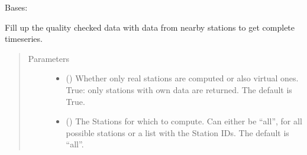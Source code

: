 \documentclass[letterpaper,10pt,english]{sphinxmanual}
\begin{document}

\begin{fulllineitems}
\label{\detokenize{weatherDB:weatherDB.stations.StationsTETBase}}
\sphinxAtStartPar
Bases: {\hyperref[\detokenize{weatherDB:weatherDB.stations.StationsBase}]{}}

\begin{fulllineitems}
\label{\detokenize{weatherDB:weatherDB.stations.StationsTETBase.fillup}}
\sphinxAtStartPar
Fill up the quality checked data with data from nearby stations to get complete timeseries.
\begin{quote}\begin{description}
\item[{Parameters}] \leavevmode\begin{itemize}
\item {} 
\sphinxAtStartPar
{} (\sphinxstyleliteralemphasis{\sphinxupquote{, }}) \textendash{} Whether only real stations are computed or also virtual ones.
True: only stations with own data are returned.
The default is True.

\item {} 
\sphinxAtStartPar
{} (\sphinxstyleliteralemphasis{\sphinxupquote{, }}) \textendash{} The Stations for which to compute.
Can either be “all”, for all possible stations
or a list with the Station IDs.
The default is “all”.

\end{itemize}


\end{description}
\end{quote}
\end{fulllineitems}
\end{fulllineitems}
\end{document}
